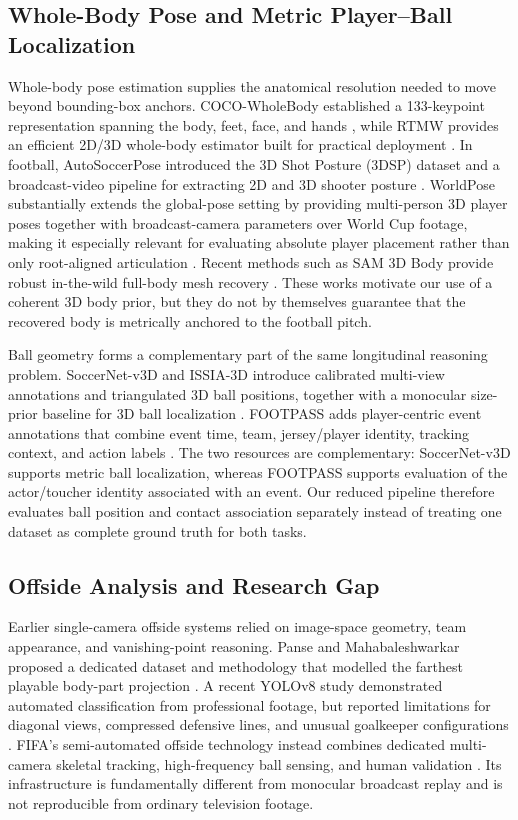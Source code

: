\documentclass[runningheads]{llncs}
\begin{document}
\subsection{Whole-Body Pose and Metric Player--Ball Localization}
Whole-body pose estimation supplies the anatomical resolution needed to move beyond bounding-box anchors. COCO-WholeBody established a 133-keypoint representation spanning the body, feet, face, and hands \cite{cocowholebody}, while RTMW provides an efficient 2D/3D whole-body estimator built for practical deployment \cite{rtmw}. In football, AutoSoccerPose introduced the 3D Shot Posture (3DSP) dataset and a broadcast-video pipeline for extracting 2D and 3D shooter posture \cite{autosoccerpose}. WorldPose substantially extends the global-pose setting by providing multi-person 3D player poses together with broadcast-camera parameters over World Cup footage, making it especially relevant for evaluating absolute player placement rather than only root-aligned articulation \cite{worldpose}. Recent methods such as SAM 3D Body provide robust in-the-wild full-body mesh recovery \cite{sam3dbody}. These works motivate our use of a coherent 3D body prior, but they do not by themselves guarantee that the recovered body is metrically anchored to the football pitch.

Ball geometry forms a complementary part of the same longitudinal reasoning problem. SoccerNet-v3D and ISSIA-3D introduce calibrated multi-view annotations and triangulated 3D ball positions, together with a monocular size-prior baseline for 3D ball localization \cite{snv3d}. FOOTPASS adds player-centric event annotations that combine event time, team, jersey/player identity, tracking context, and action labels \cite{footpass}. The two resources are complementary: SoccerNet-v3D supports metric ball localization, whereas FOOTPASS supports evaluation of the actor/toucher identity associated with an event. Our reduced pipeline therefore evaluates ball position and contact association separately instead of treating one dataset as complete ground truth for both tasks.

\subsection{Offside Analysis and Research Gap}
Earlier single-camera offside systems relied on image-space geometry, team appearance, and vanishing-point reasoning. Panse and Mahabaleshwarkar proposed a dedicated dataset and methodology that modelled the farthest playable body-part projection \cite{offside2020}. A recent YOLOv8 study demonstrated automated classification from professional footage, but reported limitations for diagonal views, compressed defensive lines, and unusual goalkeeper configurations \cite{offside2026}. FIFA's semi-automated offside technology instead combines dedicated multi-camera skeletal tracking, high-frequency ball sensing, and human validation \cite{fifasaot}. Its infrastructure is fundamentally different from monocular broadcast replay and is not reproducible from ordinary television footage.
\end{document}
